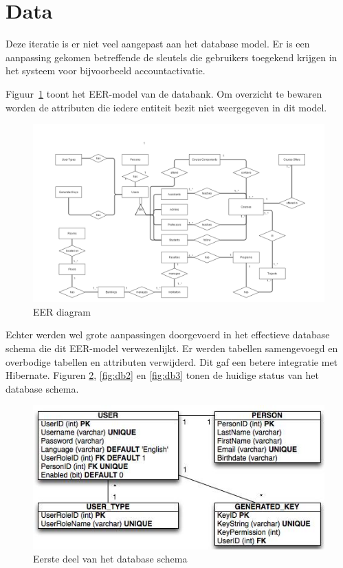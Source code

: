 \section{Data}
\label{sec:data}
Deze iteratie is er niet veel aangepast aan het database model.
Er is een aanpassing gekomen betreffende de sleutels die gebruikers toegekend krijgen in het systeem voor bijvoorbeeld accountactivatie.

Figuur~\ref{fig:EER diagram} toont het EER-model van de databank. Om overzicht te bewaren worden de attributen die iedere entiteit bezit niet weergegeven in dit model.

\begin{figure}[H]
	\centering
	\includegraphics[scale=0.4]{img/ER3-gliffy}
	\caption{EER diagram}
	\label{fig:EER diagram}
\end{figure}

Echter werden wel grote aanpassingen doorgevoerd in het effectieve database schema die dit EER-model verwezenlijkt. 
Er werden tabellen samengevoegd en overbodige tabellen en attributen verwijderd.
Dit gaf een betere integratie met Hibernate.
Figuren \ref{fig:db1}, \ref{fig:db2} en \ref{fig:db3} tonen de huidige status van het database schema.

\begin{figure}[H]
	\centering
	\includegraphics[scale=0.5]{design/EER/schema1}
	\caption{Eerste deel van het database schema}
	\label{fig:db1}
\end{figure}

